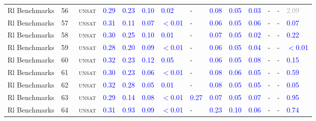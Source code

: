 \begin{center}
{\begin{longtable}{@{}llllllllllllll@{}}
Rl Benchmarks & 56 & ~\textsc{unsat} & \textcolor{blue}{0.29} & \textcolor{blue}{0.23} & \textcolor{blue}{0.10} & \textcolor{blue}{0.02} & - & \textcolor{blue}{0.08} & \textcolor{blue}{0.05} & \textcolor{blue}{0.03} & - & - & \textcolor{darkgray}{2.09} \\
Rl Benchmarks & 57 & ~\textsc{unsat} & \textcolor{blue}{0.31} & \textcolor{blue}{0.11} & \textcolor{blue}{0.07} & \textcolor{blue}{$<$0.01} & - & \textcolor{blue}{0.06} & \textcolor{blue}{0.05} & \textcolor{blue}{0.06} & - & - & \textcolor{blue}{0.07} \\
Rl Benchmarks & 58 & ~\textsc{unsat} & \textcolor{blue}{0.30} & \textcolor{blue}{0.25} & \textcolor{blue}{0.10} & \textcolor{blue}{0.01} & - & \textcolor{blue}{0.07} & \textcolor{blue}{0.05} & \textcolor{blue}{0.02} & - & - & \textcolor{blue}{0.22} \\
Rl Benchmarks & 59 & ~\textsc{unsat} & \textcolor{blue}{0.28} & \textcolor{blue}{0.20} & \textcolor{blue}{0.09} & \textcolor{blue}{$<$0.01} & - & \textcolor{blue}{0.06} & \textcolor{blue}{0.05} & \textcolor{blue}{0.04} & - & - & \textcolor{blue}{$<$0.01} \\
Rl Benchmarks & 60 & ~\textsc{unsat} & \textcolor{blue}{0.32} & \textcolor{blue}{0.23} & \textcolor{blue}{0.12} & \textcolor{blue}{0.05} & - & \textcolor{blue}{0.06} & \textcolor{blue}{0.05} & \textcolor{blue}{0.08} & - & - & \textcolor{blue}{0.15} \\
Rl Benchmarks & 61 & ~\textsc{unsat} & \textcolor{blue}{0.30} & \textcolor{blue}{0.23} & \textcolor{blue}{0.06} & \textcolor{blue}{$<$0.01} & - & \textcolor{blue}{0.08} & \textcolor{blue}{0.06} & \textcolor{blue}{0.05} & - & - & \textcolor{blue}{0.59} \\
Rl Benchmarks & 62 & ~\textsc{unsat} & \textcolor{blue}{0.32} & \textcolor{blue}{0.28} & \textcolor{blue}{0.05} & \textcolor{blue}{0.01} & - & \textcolor{blue}{0.08} & \textcolor{blue}{0.05} & \textcolor{blue}{0.05} & - & - & \textcolor{blue}{0.05} \\
Rl Benchmarks & 63 & ~\textsc{unsat} & \textcolor{blue}{0.29} & \textcolor{blue}{0.14} & \textcolor{blue}{0.08} & \textcolor{blue}{$<$0.01} & \textcolor{blue}{0.27} & \textcolor{blue}{0.07} & \textcolor{blue}{0.05} & \textcolor{blue}{0.07} & - & - & \textcolor{blue}{0.95} \\
Rl Benchmarks & 64 & ~\textsc{unsat} & \textcolor{blue}{0.31} & \textcolor{blue}{0.93} & \textcolor{blue}{0.09} & \textcolor{blue}{$<$0.01} & - & \textcolor{blue}{0.23} & \textcolor{blue}{0.10} & \textcolor{blue}{0.06} & - & - & \textcolor{blue}{0.74} \\

\end{longtable}}
\end{center}
